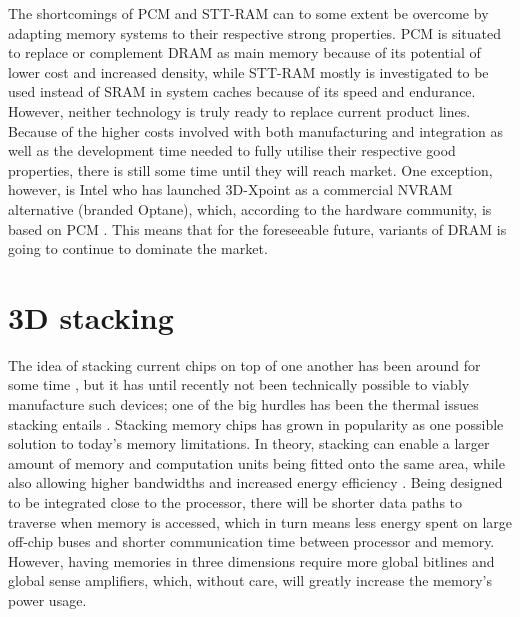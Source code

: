 The shortcomings of PCM and STT-RAM can to some extent be overcome by adapting memory systems to their respective strong properties. PCM is situated to replace or complement DRAM as main memory because of its potential of lower cost and increased density, while STT-RAM mostly is investigated to be used instead of SRAM in system caches because of its speed and endurance. However, neither technology is truly ready to replace current product lines. Because of the higher costs involved with both manufacturing and integration as well as the development time needed to fully utilise their respective good properties, there is still some time until they will reach market. One exception, however, is Intel who has launched 3D-Xpoint as a commercial NVRAM alternative (branded Optane), which, according to the hardware community, is based on PCM \cite{jeongdong_2017}. This means that for the foreseeable future, variants of DRAM is going to continue to dominate the market. 
\bigskip

\section{3D stacking}
The idea of stacking current chips on top of one another has been around for some time \cite{lee2000three, jacob2005predicting, black2006stacking}, but it has until recently not been technically possible to viably manufacture such devices; one of the big hurdles has been the thermal issues stacking entails \cite{5074080}. Stacking memory chips has grown in popularity as one possible solution to today's memory limitations. In theory, stacking can enable a larger amount of memory and computation units being fitted onto the same area, while also allowing higher bandwidths and increased energy efficiency \cite{Lee:2016:SMA:2836331.2832911}. Being designed to be integrated close to the processor, there will be shorter data paths to traverse when memory is accessed, which in turn means less energy spent on large off-chip buses and shorter communication time between processor and memory. However, having memories in three dimensions require more global bitlines and global sense amplifiers, which, without care, will greatly increase the memory's power usage.
\bigskip

